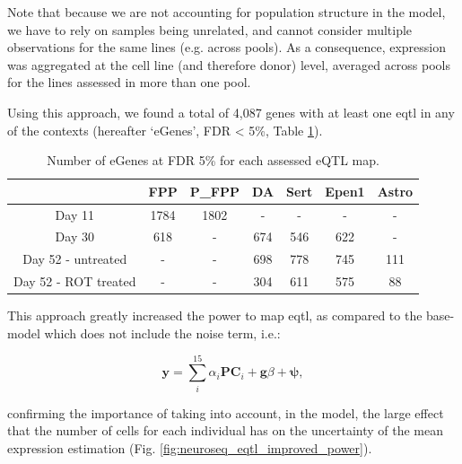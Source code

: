 Note that because we are not accounting for population structure 
in the model, we have to rely on samples being unrelated, and cannot consider multiple observations for the same lines (e.g. across pools). 
As a consequence, expression was aggregated at the cell line (and therefore donor) level, averaged across pools for the lines assessed in more than one pool. 

\newpage

Using this approach, we found
a total of 4,087 genes with at least one \gls{eqtl} in any of the contexts (hereafter `eGenes', FDR < 5\%, Table \ref{tab:eqtl_results}).

\begin{table}[h]
    \centering
    \begin{tabular}{c|c c c c c c}
    &         FPP & P\_FPP & DA & Sert & Epen1 & Astro \\
    \hline
    Day 11  &  1784 & 1802 & - & - & - & - \\
    Day 30  & 618 & - & 674 & 546 & 622 & -  \\
    Day 52 - untreated & - & - & 698 & 778 & 745 & 111 \\
    Day 52 - ROT treated & - & -  & 304 & 611 & 575 & 88 \\
    \end{tabular}
    \caption{Number of eGenes at FDR 5\% for each assessed eQTL map.}
    \label{tab:eqtl_results}
\end{table}


This approach greatly increased the power to map \gls{eqtl},
as compared to the base-model which does not include the noise term, i.e.:

\begin{equation}\label{eq:neuroseq_base}
    \mathbf{y} = \sum_i^{15}\alpha_i \mathbf{PC}_i + \mathbf{g}\beta + \boldsymbol{\psi},
\end{equation}

confirming the importance of taking into account, in the model, the large effect that the number of cells for each individual has on the 
uncertainty
of the mean expression estimation (Fig. \ref{fig:neuroseq_eqtl_improved_power}).




